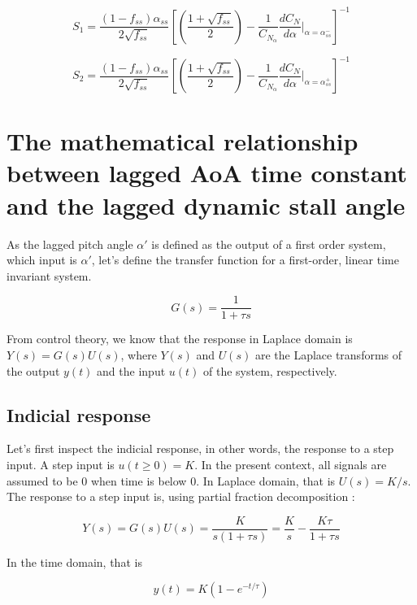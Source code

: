\begin{equation}
S_1 = \frac{(1-f_{ss})\alpha_{ss}}{2\sqrt{f_{ss}}}\left[\left(\frac{1+\sqrt{f_{ss}}}{2}\right)-\frac{1}{C_{N_\alpha}}\frac{dC_N}{d\alpha}\Big|_{\alpha=\alpha_{ss}^{-}}\right]^{-1}
\end{equation}

\begin{equation}
S_2 = \frac{(1-f_{ss})\alpha_{ss}}{2\sqrt{f_{ss}}}\left[\left(\frac{1+\sqrt{f_{ss}}}{2}\right)-\frac{1}{C_{N_\alpha}}\frac{dC_N}{d\alpha}\Big|_{\alpha=\alpha_{ss}^{+}}\right]^{-1}
\end{equation}

\section{The mathematical relationship between lagged AoA time constant and the lagged dynamic stall angle}

As the lagged pitch angle $\alpha'$ is defined as the output of a first order system, which input is $\alpha'$, let's define the transfer function for a first-order, linear time invariant system. 

\begin{equation}
G(s) = \frac{1}{1+\tau s}
\end{equation}

\noindent From control theory, we know that the response in Laplace domain is $Y(s) = G(s)U(s)$, where $Y(s)$ and $U(s)$ are the Laplace transforms of the output $y(t)$ and the input $u(t)$ of the system, respectively.

\subsection{Indicial response}

Let's first inspect the indicial response, in other words, the response to a step input. A step input is $u(t \geq 0) = K$. In the present context, all signals are assumed to be $0$ when time is below 0. In Laplace domain, that is $U(s) = K/s$. The response to a step input is, using partial fraction decomposition : 

\begin{equation}
Y(s) = G(s)U(s) = \frac{K}{s(1+\tau s)} =\frac{K}{s} - \frac{K\tau}{1+\tau s}
\end{equation}

\noindent In the time domain, that is 

\begin{equation}
y(t) = K(1-e^{-t/\tau})
\end{equation}

